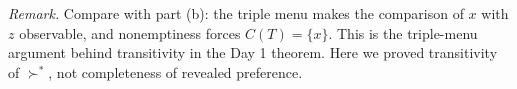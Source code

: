 \documentclass[12pt]{article}
\newenvironment{remark}
  {\par\medskip\noindent\textit{Remark.}\enspace}
  {\par\medskip}
\begin{document}
\begin{remark}
  Compare with part (b): the triple menu makes the comparison of $x$ with $z$
  observable, and nonemptiness forces $C(T)=\{x\}$. This is the triple-menu
  argument behind transitivity in the Day 1 theorem. Here we proved
  transitivity of $\succ^{*}$, not completeness of revealed preference.
\end{remark}
\end{document}
